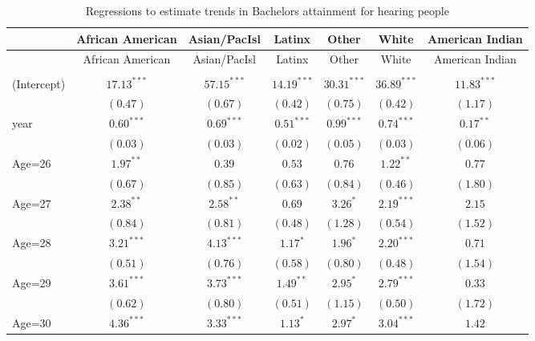 \documentclass[fullpage]{paper}
\begin{document}
\begin{center}
\begin{longtable}{l c c c c c c }
\hline
 & African American & Asian/PacIsl & Latinx & Other & White & American Indian \\
\hline
\endfirsthead
\hline
 & African American & Asian/PacIsl & Latinx & Other & White & American Indian \\
\hline
\endhead
\hline
\endfoot
\hline
\multicolumn{7}{l}{\scriptsize{$^{***}p<0.001$, $^{**}p<0.01$, $^*p<0.05$}}\\
\caption{Regressions to estimate trends in Bachelors attainment for hearing people}
\label{table:coefficients}
\endlastfoot
(Intercept) & $17.13^{***}$ & $57.15^{***}$  & $14.19^{***}$ & $30.31^{***}$  & $36.89^{***}$  & $11.83^{***}$ \\
            & $(0.47)$      & $(0.67)$       & $(0.42)$      & $(0.75)$       & $(0.42)$       & $(1.17)$      \\
year        & $0.60^{***}$  & $0.69^{***}$   & $0.51^{***}$  & $0.99^{***}$   & $0.74^{***}$   & $0.17^{**}$   \\
            & $(0.03)$      & $(0.03)$       & $(0.02)$      & $(0.05)$       & $(0.03)$       & $(0.06)$      \\
Age=26      & $1.97^{**}$   & $0.39$         & $0.53$        & $0.76$         & $1.22^{**}$    & $0.77$        \\
            & $(0.67)$      & $(0.85)$       & $(0.63)$      & $(0.84)$       & $(0.46)$       & $(1.80)$      \\
Age=27      & $2.38^{**}$   & $2.58^{**}$    & $0.69$        & $3.26^{*}$     & $2.19^{***}$   & $2.15$        \\
            & $(0.84)$      & $(0.81)$       & $(0.48)$      & $(1.28)$       & $(0.54)$       & $(1.52)$      \\
Age=28      & $3.21^{***}$  & $4.13^{***}$   & $1.17^{*}$    & $1.96^{*}$     & $2.20^{***}$   & $0.71$        \\
            & $(0.51)$      & $(0.76)$       & $(0.58)$      & $(0.80)$       & $(0.48)$       & $(1.54)$      \\
Age=29      & $3.61^{***}$  & $3.73^{***}$   & $1.49^{**}$   & $2.95^{*}$     & $2.79^{***}$   & $0.33$        \\
            & $(0.62)$      & $(0.80)$       & $(0.51)$      & $(1.15)$       & $(0.50)$       & $(1.72)$      \\
Age=30      & $4.36^{***}$  & $3.33^{***}$   & $1.13^{*}$    & $2.97^{*}$     & $3.04^{***}$   & $1.42$        \\

\end{longtable}
\end{center}
\end{document}

